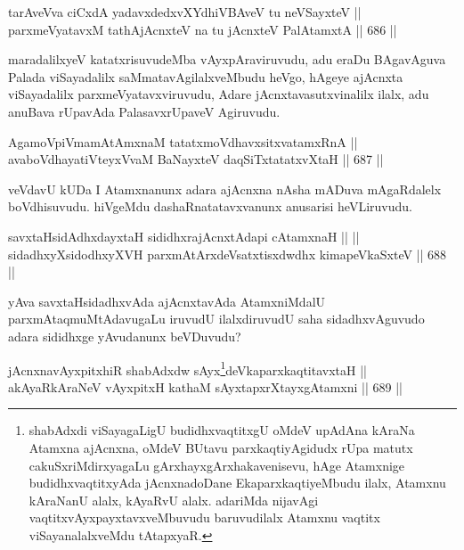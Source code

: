 \begin{shl}
tarAveVva ciCxdA yadavxdedxvXYdhiVBAveV tu neVSayxteV || \\
parxmeVyatavxM tathA\s jAcnxteV na tu jAcnxteV PalAtamxtA \hfill || 686 ||  
\end{shl}

\begin{artha} 
maradalilxyeV katatxrisuvudeMba vAyxpAraviruvudu, adu eraDu BAgavAguva Palada viSayadalilx saMmatavAgilalxveMbudu heVgo, hAgeye ajAcnxta viSayadalilx parxmeVyatavxviruvudu, Adare jAcnxtavasutxvinalilx ilalx, adu anuBava rUpavAda PalasavxrUpaveV Agiruvudu.
\end{artha}

\begin{shl}
AgamoV\s piVmamAtAmxnaM tatatxmoVdhavxsitxvatamxRnA || \\
avaboVdhayatiVteyxVvaM BaNayxteV daqSiTxtatatxvXtaH \hfill || 687 ||  
\end{shl}

\begin{artha} 
veVdavU kUDa I Atamxnanunx adara ajAcnxna nAsha mADuva mAgaRdalelx boVdhisuvudu. hiVgeMdu dashaRnatatavxvanunx anusarisi heVLiruvudu.
\end{artha}

\begin{shl}
savxtaHsidAdhxdayxtaH sididhxrajAcnxtAdapi cA\s \s tamxnaH ||  || \\
sidadhxyXsidodhxyXVH parxmAtArxdeVsatxtisxdwdhx kimapeVkaSxteV \hfill || 688 ||  
\end{shl}

\begin{artha} 
yAva savxtaHsidadhxvAda ajAcnxtavAda AtamxniMdalU parxmAtaq\break muMtAdavugaLu iruvudU ilalxdiruvudU saha sidadhxvAguvudo adara sididhxge yAvudanunx beVDuvudu?
\end{artha}


\begin{shl}
jAcnxnavAyxpitxhiR shabAdxdw sAyx\footnote{shabAdxdi viSayagaLigU budidhxvaqtitxgU oMdeV upAdAna kAraNa Atamxna ajAcnxna, oMdeV BUtavu parxkaqtiyAgidudx rUpa matutx cakuSxriMdirxyagaLu gArxhayxgArxhakavenisevu, hAge Atamxnige budidhxvaqtitxyAda jAcnxnadoDane EkaparxkaqtiyeMbudu ilalx, Atamxnu kAraNanU alalx, kAyaRvU alalx. adariMda nijavAgi vaqtitxvAyxpayxtavxveMbuvudu baruvudilalx Atamxnu vaqtitx viSayanalalxveMdu tAtapxyaR.}deVkaparxkaqtitavxtaH || \\
akAyaRkAraNeV vAyxpitxH kathaM sAyxtapxrXtayxgAtamxni \hfill || 689 ||  
\end{shl}

